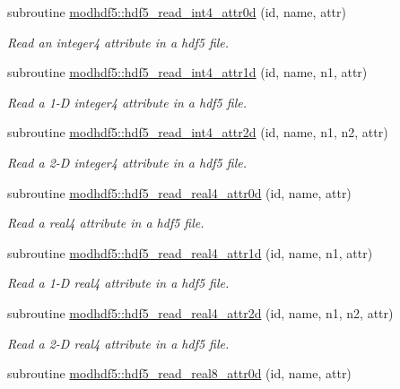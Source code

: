 \begin{DoxyCompactItemize}
subroutine \hyperlink{namespacemodhdf5_a10a4b5212d77e52dba2616ba3abb7df1}{modhdf5\+::hdf5\+\_\+read\+\_\+int4\+\_\+attr0d} (id, name, attr)
\begin{DoxyCompactList}\small\item\em Read an integer4 attribute in a hdf5 file. \end{DoxyCompactList}\item 
subroutine \hyperlink{namespacemodhdf5_a2ff1b28dd896cc37583e97a52348039f}{modhdf5\+::hdf5\+\_\+read\+\_\+int4\+\_\+attr1d} (id, name, n1, attr)
\begin{DoxyCompactList}\small\item\em Read a 1-\/D integer4 attribute in a hdf5 file. \end{DoxyCompactList}\item 
subroutine \hyperlink{namespacemodhdf5_a4ca8f47995bf9df5b6c892781c87dd95}{modhdf5\+::hdf5\+\_\+read\+\_\+int4\+\_\+attr2d} (id, name, n1, n2, attr)
\begin{DoxyCompactList}\small\item\em Read a 2-\/D integer4 attribute in a hdf5 file. \end{DoxyCompactList}\item 
subroutine \hyperlink{namespacemodhdf5_a6cf3b8369d7cbc96e8639439eb7c51ff}{modhdf5\+::hdf5\+\_\+read\+\_\+real4\+\_\+attr0d} (id, name, attr)
\begin{DoxyCompactList}\small\item\em Read a real4 attribute in a hdf5 file. \end{DoxyCompactList}\item 
subroutine \hyperlink{namespacemodhdf5_acd7e7ad91ecc73c632ddc76468dbd083}{modhdf5\+::hdf5\+\_\+read\+\_\+real4\+\_\+attr1d} (id, name, n1, attr)
\begin{DoxyCompactList}\small\item\em Read a 1-\/D real4 attribute in a hdf5 file. \end{DoxyCompactList}\item 
subroutine \hyperlink{namespacemodhdf5_a783cb12e2d85f812c506fff7cc69f37a}{modhdf5\+::hdf5\+\_\+read\+\_\+real4\+\_\+attr2d} (id, name, n1, n2, attr)
\begin{DoxyCompactList}\small\item\em Read a 2-\/D real4 attribute in a hdf5 file. \end{DoxyCompactList}\item 
subroutine \hyperlink{namespacemodhdf5_ad2a6c1b4f0229be1ac9f4e4eb0556af4}{modhdf5\+::hdf5\+\_\+read\+\_\+real8\+\_\+attr0d} (id, name, attr)

\end{DoxyCompactItemize}
